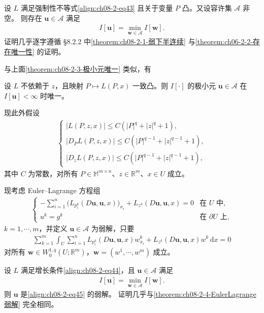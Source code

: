 \documentclass[../../main.tex]{subfiles}
\begin{document}
\begin{theorem}[极小元的存在性]\label{theorem:ch08-2-5-方程组存在}
设 $L$ 满足强制性不等式\eqref{align:ch08-2-eq43} 且关于变量 $P$ 凸。又设容许集 $\mathcal{A}$ 非空。
则存在 $\mathbf{u}\in\mathcal{A}$ 满足
\begin{align*}
I[\mathbf{u}]=\min_{\mathbf{w}\in\mathcal{A}}I[\mathbf{w}].
\end{align*}
证明几乎逐字遵循 \S8.2.2 中\cref{theorem:ch08-2-1-弱下半连续} 与\cref{theorem:ch06-2-2-存在唯一性} 的证明。
\end{theorem}

与上面\cref{theorem:ch08-2-3-极小元唯一} 类似，有

\begin{theorem}[极小元的唯一性]\label{theorem:ch08-2-6-方程组唯一}
设 $L$ 不依赖于 $z$，且映射 $P\mapsto L(P,x)$ 一致凸。则 $I[\cdot]$ 的极小元 $\mathbf{u}\in\mathcal{A}$ 在 $I[\mathbf{u}]<\infty$ 时唯一。
\end{theorem}

现此外假设
\begin{align}
\begin{cases}
|L(P,z,x)|\leqslant C(|P|^q+|z|^q+1),\\
|D_PL(P,z,x)|\leqslant C(|P|^{q-1}+|z|^{q-1}+1),\\
|D_zL(P,z,x)|\leqslant C(|P|^{q-1}+|z|^{q-1}+1),
\end{cases}\label{align:ch08-2-eq44}
\end{align}
其中 $C$ 为常数，对所有 $P\in\mathbb{M}^{m\times n}$、$z\in\mathbb{R}^m$、$x\in U$ 成立。

现考虑 Euler--Lagrange 方程组
\begin{align}
\begin{cases}
-\sum_{i=1}^n\big(L_{p_i^k}(D\mathbf{u},\mathbf{u},x)\big)_{x_i}+L_{z^k}(D\mathbf{u},\mathbf{u},x)=0&\text{在 }U\text{ 中},\\
u^k=g^k&\text{在 }\partial U\text{ 上},
\end{cases}\label{align:ch08-2-eq45}
\end{align}
$k=1,\cdots,m$，并定义 $\mathbf{u}\in\mathcal{A}$ 为弱解，只要
\begin{align*}
\sum_{k=1}^m\int_U\sum_{i=1}^n L_{p_i^k}(D\mathbf{u},\mathbf{u},x)w_{x_i}^k+L_{z^k}(D\mathbf{u},\mathbf{u},x)w^k\,\mathrm{d}x=0
\end{align*}
对所有 $\mathbf{w}\in W_0^{1,q}(U;\mathbb{R}^m)$，$\mathbf{w}=(w^1,\cdots,w^m)$ 成立。

\begin{theorem}\label{theorem:ch08-2-7-方程组弱解}
设 $L$ 满足增长条件\eqref{align:ch08-2-eq44}，且 $\mathbf{u}\in\mathcal{A}$ 满足
\begin{align*}
I[\mathbf{u}]=\min_{\mathbf{w}\in\mathcal{A}}I[\mathbf{w}].
\end{align*}
则 $\mathbf{u}$ 是\eqref{align:ch08-2-eq45} 的弱解。
证明几乎与\cref{theorem:ch08-2-4-EulerLagrange弱解} 完全相同。
\end{theorem}
\end{document}
